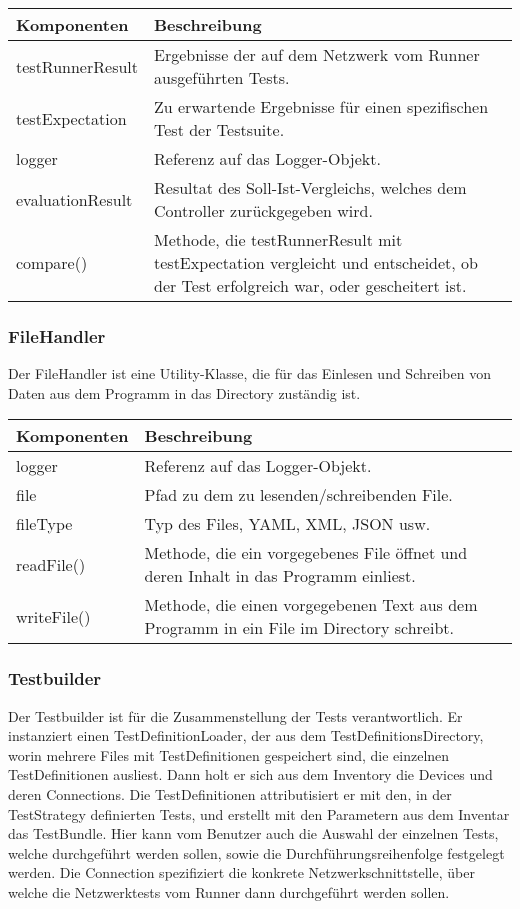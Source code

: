 \documentclass[
	ngerman,
	toc=listof, %
	toc=bibliography, %
	footnotes=multiple, %
	parskip=half, %
	numbers=noendperiod %
]{scrartcl}
\begin{document}
	\begin{tabularx}{\textwidth}{lX}
		\toprule
			Komponenten & Beschreibung \\
		\midrule
			testRunnerResult & Ergebnisse der auf dem Netzwerk vom Runner ausgeführten Tests. \\
			testExpectation & Zu erwartende Ergebnisse für einen spezifischen Test der Testsuite. \\
			logger & Referenz auf das Logger-Objekt. \\
			evaluationResult & Resultat des Soll-Ist-Vergleichs, welches dem Controller zurückgegeben wird.\\
		\midrule
			compare() & Methode, die testRunnerResult mit testExpectation vergleicht und entscheidet, ob der Test erfolgreich war, oder gescheitert ist. \\
		\bottomrule
	\end{tabularx}
	\newpage

	\subsubsection{FileHandler}
	Der FileHandler ist eine Utility-Klasse, die für das Einlesen und Schreiben von Daten aus dem Programm in das Directory zuständig ist.
	
	\begin{tabularx}{\textwidth}{lX}
		\toprule
			Komponenten & Beschreibung \\
		\midrule
			logger & Referenz auf das Logger-Objekt. \\
			file & Pfad zu dem zu lesenden/schreibenden File. \\
			fileType & Typ des Files, YAML, XML, JSON usw. \\
		\midrule
			readFile() & Methode, die ein vorgegebenes File öffnet und deren Inhalt in das Programm einliest. \\
			writeFile() & Methode, die einen vorgegebenen Text aus dem Programm in ein File im Directory schreibt. \\
		\bottomrule
	\end{tabularx}

	\subsubsection{Testbuilder}
	Der Testbuilder ist für die Zusammenstellung der Tests verantwortlich. 
	Er instanziert einen TestDefinitionLoader, der aus dem TestDefinitionsDirectory, worin mehrere Files mit TestDefinitionen gespeichert sind, die einzelnen TestDefinitionen ausliest.
	Dann holt er sich aus dem Inventory die Devices und deren Connections. 
	Die TestDefinitionen attributisiert er mit den, in der TestStrategy definierten Tests, und erstellt mit den Parametern aus dem Inventar das TestBundle. 
	Hier kann vom Benutzer auch die Auswahl der einzelnen Tests, welche durchgeführt werden sollen, sowie die Durchführungsreihenfolge festgelegt werden.
	Die Connection spezifiziert die konkrete Netzwerkschnittstelle, über welche die Netzwerktests vom Runner dann durchgeführt werden sollen.
\end{document}
